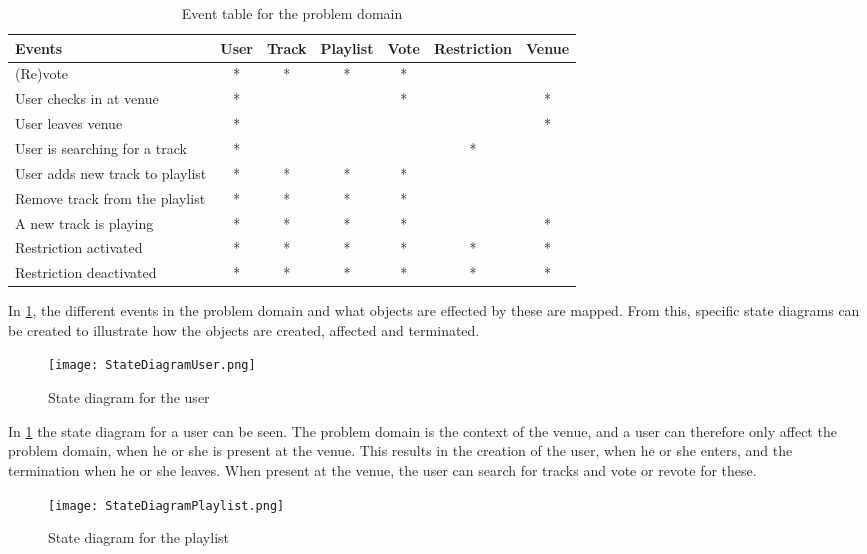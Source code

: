 \begin{table}[htbp]
    \begin{tabular}{lcccccc}
        \toprule
        \textbf{Events} & User & Track & Playlist & Vote & Restriction & Venue\\
        \midrule
        (Re)vote & * & * & * & * &   &   \\
        User checks in at venue & * &   &   & * &   & * \\
        User leaves venue & * &   &   &   &   & * \\
        User is searching for a track & * &   &   &   & * &   \\
        User adds new track to playlist & * & * & * & * &   &   \\
        Remove track from the playlist & * & * & * & * &   &   \\
        A new track is playing & * & * & * & * &   & * \\
        Restriction activated & * & * & * & * & * & * \\
        Restriction deactivated & * & * & * & * & * & * \\
        \bottomrule
    \end{tabular}
    \caption{Event table for the problem domain}\label{eventtable}
\end{table}

In \cref{eventtable}, the different events in the problem domain and what objects are effected by these are mapped. From this, specific state diagrams can be created to illustrate how the objects are created, affected and terminated.

\begin{figure}[H]
  \centering
  \texttt{[image: StateDiagramUser.png]}
  \caption{State diagram for the user}\label{fig:StateDiagramUser}
\end{figure}

In \cref{fig:StateDiagramUser} the state diagram for a user can be seen. The problem domain is the context of the venue, and a user can therefore only affect the problem domain, when he or she is present at the venue. This results in the creation of the user, when he or she enters, and the termination when he or she leaves. When present at the venue, the user can search for tracks and vote or revote for these.

\begin{figure}[H]
  \centering
  \texttt{[image: StateDiagramPlaylist.png]}
  \caption{State diagram for the playlist}\label{fig:StateDiagramPlaylist}
\end{figure}

